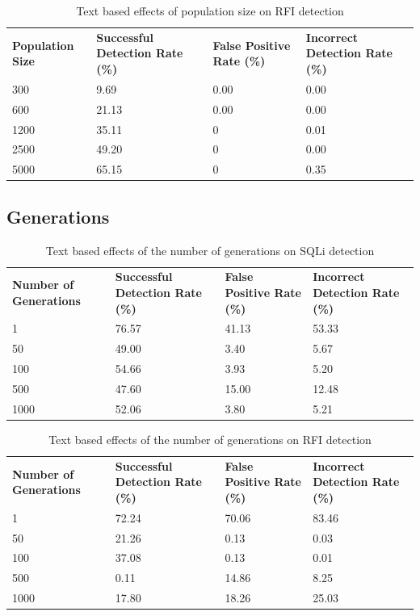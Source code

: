 \begin{appendices}
\begin{table}[h]
\begin{tabular}{|p{1.5in}|p{1in}|p{1in}|p{1in}|}
	\hline
	\textbf{Population Size} & \textbf{Successful Detection Rate (\%)} & \textbf{False Positive Rate (\%)} & \textbf{Incorrect Detection Rate (\%)}  \\
	\hhline{|=|=|=|=|}
	300 & 9.69 & 0.00 & 0.00 \\
	\hline
	600 & 21.13 & 0.00 & 0.00 \\
	\hline
	1200 & 35.11 & 0 & 0.01 \\
	\hline
	2500 & 49.20 & 0 & 0.00 \\
	\hline
	5000 & 65.15 & 0 & 0.35 \\
	\hline
	\end{tabular}
	\caption{Text based effects of population size on RFI detection}
\end{table}

\newpage
\subsection{Generations}

\begin{table}[hp]
	\centering
	\begin{tabular}{|p{1.5in}|p{1in}|p{1in}|p{1in}|}
	\hline
	\textbf{Number of Generations} & \textbf{Successful Detection Rate (\%)} & \textbf{False Positive Rate (\%)} & \textbf{Incorrect Detection Rate (\%)}  \\
	\hhline{|=|=|=|=|}
	1 & 76.57 & 41.13 & 53.33 \\
	\hline
	50 & 49.00 & 3.40 & 5.67 \\
	\hline
	100 & 54.66 & 3.93 & 5.20 \\
	\hline
	500 & 47.60 & 15.00 & 12.48 \\
	\hline
	1000 & 52.06 & 3.80 & 5.21 \\
	\hline
	\end{tabular}
	\caption{Text based effects of the number of generations on SQLi detection}
\end{table}

\begin{table}[h]
	\centering
	\begin{tabular}{|p{1.5in}|p{1in}|p{1in}|p{1in}|}
	\hline
	\textbf{Number of Generations} & \textbf{Successful Detection Rate (\%)} & \textbf{False Positive Rate (\%)} & \textbf{Incorrect Detection Rate (\%)}  \\
	\hhline{|=|=|=|=|}
	1 & 72.24 & 70.06 & 83.46 \\
	\hline
	50 & 21.26 & 0.13 & 0.03 \\
	\hline
	100 & 37.08 & 0.13 & 0.01 \\
	\hline
	500 & 0.11 & 14.86 & 8.25 \\
	\hline
	1000 & 17.80 & 18.26 & 25.03 \\
	\hline
	\end{tabular}
	\caption{Text based effects of the number of generations on RFI detection}
\end{table}


\end{appendices}
